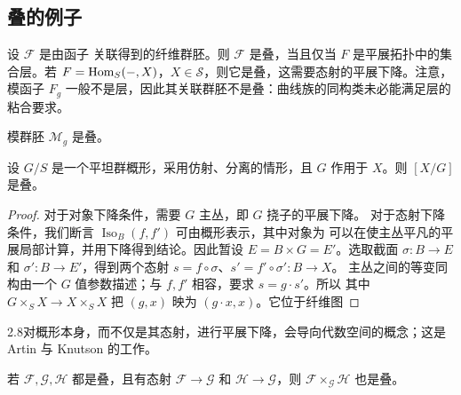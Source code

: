 \subsection{叠的例子}
\begin{example}\label{ex:2.16}
设 $\mathcal F$ 是由函子
关联得到的纤维群胚。则 $\mathcal F$ 是叠，当且仅当 $F$ 是平展拓扑中的集合层。若 $F=\operatorname{Hom}_S(-,X)$，$X\in\mathcal S$，则它是叠，这需要态射的平展下降。注意，模函子 $F_g$ 一般不是层，因此其关联群胚不是叠：曲线族的同构类未必能满足层的粘合要求。
\end{example}
\begin{example}\label{ex:2.17}模群胚 $\mathcal M_g$ 是叠。\end{example}
\begin{proposition}\label{pro:2.3}
设 $G/S$ 是一个平坦群概形，采用仿射、分离的情形，且 $G$ 作用于 $X$。则 $[X/G]$ 是叠。
\end{proposition}
\begin{proof}
对于对象下降条件，需要 $G$ 主丛，即 $G$ 挠子的平展下降。
对于态射下降条件，我们断言 $\operatorname{Iso}_B(f,f')$ 可由概形表示，其中对象为
可以在使主丛平凡的平展局部计算，并用下降得到结论。因此暂设 $E=B\times G=E'$。选取截面 $\sigma:B\to E$ 和 $\sigma':B\to E'$，得到两个态射 $s=f\circ\sigma$、$s'=f'\circ\sigma':B\to X$。
主丛之间的等变同构由一个 $G$ 值参数描述；与 $f,f'$ 相容，要求 $s=g\cdot s'$。所以
其中 $G\times_SX\to X\times_SX$ 把 $(g,x)$ 映为 $(g\cdot x,x)$。它位于纤维图

\end{proof}
\begin{Note}{2.8}对概形本身，而不仅是其态射，进行平展下降，会导向代数空间的概念；这是 Artin 与 Knutson 的工作。\end{Note}
\begin{example}\label{ex:2.18}
若 $\mathcal F,\mathcal G,\mathcal H$ 都是叠，且有态射 $\mathcal F\to\mathcal G$ 和 $\mathcal H\to\mathcal G$，则 $\mathcal F\times_{\mathcal G}\mathcal H$ 也是叠。
\end{example}
